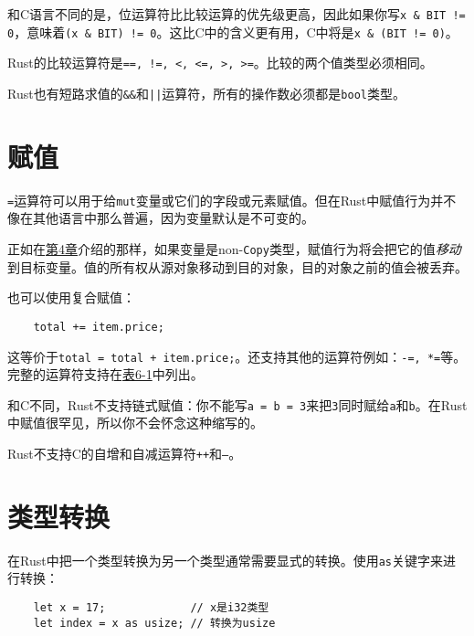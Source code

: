 和C语言不同的是，位运算符比比较运算的优先级更高，因此如果你写\texttt{x \& BIT != 0}，意味着\texttt{(x \& BIT) != 0}。这比C中的含义更有用，C中将是\texttt{x \& (BIT != 0)}。

Rust的比较运算符是\texttt{==, !=, <, <=, >, >=}。比较的两个值类型必须相同。

Rust也有短路求值的\texttt{\&\&}和\texttt{||}运算符，所有的操作数必须都是\texttt{bool}类型。

\section{赋值}

\texttt{=}运算符可以用于给\texttt{mut}变量或它们的字段或元素赋值。但在Rust中赋值行为并不像在其他语言中那么普遍，因为变量默认是不可变的。

正如在\hyperref[ch04]{第4章}介绍的那样，如果变量是non-\texttt{Copy}类型，赋值行为将会把它的值\emph{移动}到目标变量。值的所有权从源对象移动到目的对象，目的对象之前的值会被丢弃。

也可以使用复合赋值：
\begin{verbatim}
    total += item.price;
\end{verbatim}

这等价于\texttt{total = total + item.price;}。还支持其他的运算符例如：\texttt{-=, *=}等。完整的运算符支持在\hyperref[t6-1]{表6-1}中列出。

和C不同，Rust不支持链式赋值：你不能写\texttt{a = b = 3}来把\texttt{3}同时赋给\texttt{a}和\texttt{b}。在Rust中赋值很罕见，所以你不会怀念这种缩写的。

Rust不支持C的自增和自减运算符\texttt{++}和\texttt{--}。

\section{类型转换}\label{cast}

在Rust中把一个类型转换为另一个类型通常需要显式的转换。使用\texttt{as}关键字来进行转换：
\begin{verbatim}
    let x = 17;             // x是i32类型
    let index = x as usize; // 转换为usize
\end{verbatim}

